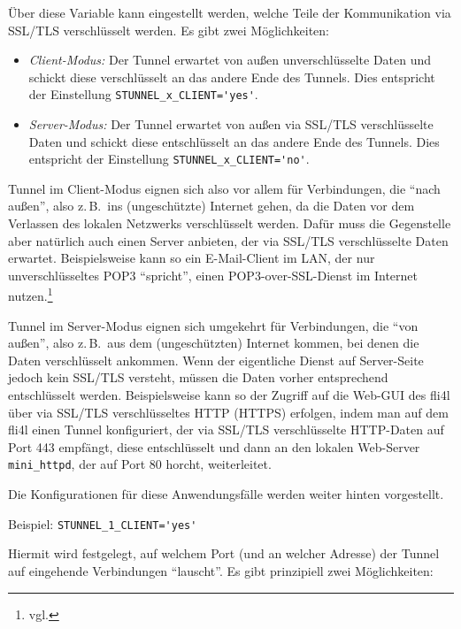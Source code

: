 \begin{description}
Über diese Variable kann eingestellt werden, welche Teile der Kommunikation via
SSL/TLS verschlüsselt werden. Es gibt zwei Möglichkeiten:

\begin{itemize}
\item \emph{Client-Modus:} Der Tunnel erwartet von außen unverschlüsselte
Daten und schickt diese verschlüsselt an das andere Ende des Tunnels. Dies
entspricht der Einstellung \verb+STUNNEL_x_CLIENT='yes'+.
\item \emph{Server-Modus:} Der Tunnel erwartet von außen via SSL/TLS
verschlüsselte Daten und schickt diese entschlüsselt an das andere Ende des
Tunnels. Dies entspricht der Einstellung \verb+STUNNEL_x_CLIENT='no'+.
\end{itemize}

Tunnel im Client-Modus eignen sich also vor allem für Verbindungen, die ``nach
außen'', also z.\,B.\ ins (ungeschützte) Internet gehen, da die Daten vor dem
Verlassen des lokalen Netzwerks verschlüsselt werden. Dafür muss die Gegenstelle
aber natürlich auch einen Server anbieten, der via SSL/TLS verschlüsselte Daten
erwartet. Beispielsweise kann so ein E-Mail-Client im LAN, der nur
unverschlüsseltes POP3 ``spricht'', einen POP3-over-SSL-Dienst im Internet
nutzen.\footnote{vgl. }

Tunnel im Server-Modus eignen sich umgekehrt für Verbindungen, die ``von
außen'', also z.\,B.\ aus dem (ungeschützten) Internet kommen, bei denen die
Daten verschlüsselt ankommen. Wenn der eigentliche Dienst auf Server-Seite
jedoch kein SSL/TLS versteht, müssen die Daten vorher entsprechend entschlüsselt
werden. Beispielsweise kann so der Zugriff auf die Web-GUI des fli4l über
via SSL/TLS verschlüsseltes HTTP (HTTPS) erfolgen, indem man auf dem fli4l
einen Tunnel konfiguriert, der via SSL/TLS verschlüsselte HTTP-Daten auf Port
443 empfängt, diese entschlüsselt und dann an den lokalen Web-Server
\texttt{mini\_httpd}, der auf Port 80 horcht, weiterleitet.

Die Konfigurationen für diese Anwendungsfälle werden weiter hinten vorgestellt.

Beispiel: \verb+STUNNEL_1_CLIENT='yes'+


Hiermit wird festgelegt, auf welchem Port (und an welcher Adresse) der Tunnel
auf eingehende Verbindungen ``lauscht''. Es gibt prinzipiell zwei Möglichkeiten:


\end{description}
